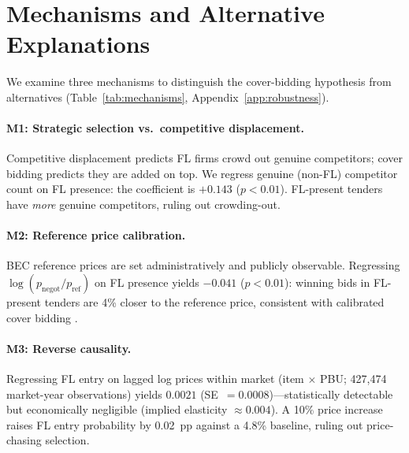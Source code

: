 \section{Mechanisms and Alternative Explanations}
\label{sec:mechanisms}

We examine three mechanisms to distinguish the cover-bidding hypothesis
from alternatives (Table~\ref{tab:mechanisms},
Appendix~\ref{app:robustness}).

\paragraph{M1: Strategic selection vs.\ competitive displacement.}
Competitive displacement predicts FL firms crowd out genuine
competitors; cover bidding predicts they are added on top. We regress
genuine (non-FL) competitor count on FL presence: the coefficient is
$+0.143$ ($p < 0.01$). FL-present tenders have \emph{more} genuine
competitors, ruling out crowding-out.

\paragraph{M2: Reference price calibration.}
BEC reference prices are set administratively and publicly observable.
Regressing $\log(p_{\text{negot}} / p_{\text{ref}})$ on FL presence
yields $-0.041$ ($p < 0.01$): winning bids in FL-present tenders are
4\% closer to the reference price, consistent with calibrated cover
bidding \citep{marshall2012economics}.

\paragraph{M3: Reverse causality.}
Regressing FL entry on lagged log prices within market (item $\times$
PBU; 427,474 market-year observations) yields $0.0021$
(SE~$= 0.0008$)---statistically detectable but economically negligible
(implied elasticity $\approx 0.004$). A 10\% price increase raises FL
entry probability by 0.02~pp against a 4.8\% baseline, ruling out
price-chasing selection.

